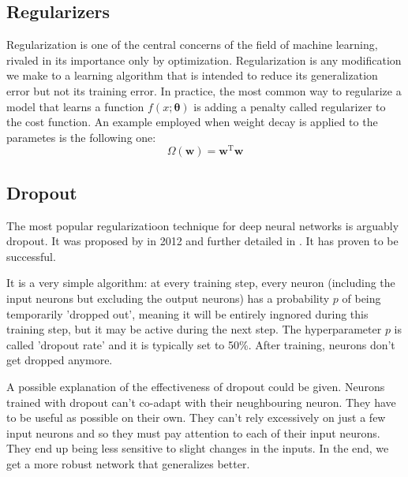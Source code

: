 \subsection{Regularizers}
Regularization is one of the central concerns of the field of machine learning, rivaled in its importance only by optimization. Regularization is any modification we make to a learning algorithm that is intended to reduce its generalization error but not its training error\footnotemark. In practice, the most common way to regularize a model that learns a function $f(x;\bm{\theta})$ is adding a penalty called regularizer to the cost function. An example employed when weight decay is applied to the parametes is the following one:
\begin{equation}
    \Omega(\mathbf{w}) = \mathbf{w}^\mathrm{T} \mathbf{w}
\end{equation}



\subsection{Dropout}
The most popular regularizatioon technique for deep neural networks is arguably dropout. It was proposed by \cite{hinton} in 2012 and further detailed in \cite{srivastava}. It has proven to be successful.

It is a very simple algorithm: at every training step, every neuron (including the input neurons but excluding the output neurons) has a probability $p$ of being temporarily 'dropped out', meaning it will be entirely ingnored during this training step, but it may be active during the next step. The hyperparameter $p$ is called 'dropout rate' and it is typically set to 50\%. After training, neurons don't get dropped anymore.

\begin{figure}[H]
	\centering
	
	\label{fig:DROPOUT}
\end{figure}

A possible explanation of the effectiveness of dropout could be given. Neurons trained with dropout can't co-adapt with their neughbouring neuron. They have to be useful as possible on their own. They can't rely excessively on just a few input neurons and so they must pay attention to each of their input neurons. They end up being less sensitive to slight changes in the inputs. In the end, we get a more robust network that generalizes better.




